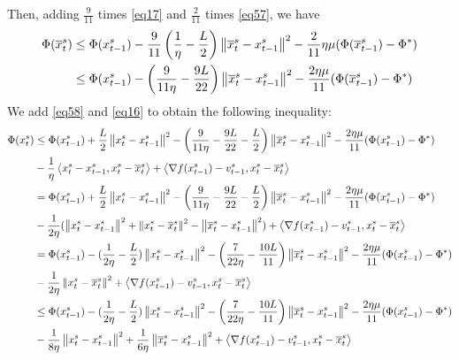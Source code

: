 \documentclass{article}
\newcommand{\norm}[1]{\left\lVert#1\right\rVert}
\newcommand{\Iprod}[2]{\left\langle #1,#2\right\rangle}
\theoremstyle{definition}
\theoremstyle{remark}
\begin{document}
Then, adding $\frac{9}{11}$ times \eqref{eq17} and $\frac{2}{11}$ times \eqref{eq57}, we have 
\begin{align}
\Phi(\overline{x}^s_t) &\leq \Phi({x}^s_{t-1}) -\frac{9}{11}\left(\frac{1}{\eta}-\frac{L}{2}\right) \norm{\overline{x}^s_t - {x}^s_{t-1}}^2-\frac{2}{11}\eta\mu(\Phi(\overline{x}^s_{t-1})-\Phi^*)\notag\\
&\leq \Phi({x}^s_{t-1}) -\left(\frac{9}{11\eta}-\frac{9L}{22}\right) \norm{\overline{x}^s_t - {x}^s_{t-1}}^2-\frac{2\eta\mu}{11}(\Phi(\overline{x}^s_{t-1})-\Phi^*)\label{eq58}
\end{align}
We add \eqref{eq58} and \eqref{eq16} to obtain the following inequality:
\begin{align}
\Phi({x}^s_t) &\leq \Phi({x}^s_{t-1}) +\frac{L}{2}\norm{{x}^s_{t}-{x}^s_{t-1}}^2-\left(\frac{9}{11\eta}-\frac{9L}{22}-\frac{L}{2}\right) \norm{\overline{x}^s_t - {x}^s_{t-1}}^2-\frac{2\eta\mu}{11}(\Phi({x}^s_{t-1})-\Phi^*)\notag\\
&-\frac{1}{\eta}\Iprod{{x}^s_t - {x}^s_{t-1}}{{x}^s_t - \overline{x}^s_{t}}+\Iprod{\nabla f({x}^s_{t-1}) - v_{t-1}^s}{{x}^s_t - \overline{x}^s_{t}}\notag\\
&= \Phi({x}^s_{t-1}) +\frac{L}{2}\norm{{x}^s_{t}-{x}^s_{t-1}}^2-\left(\frac{9}{11\eta}-\frac{9L}{22}-\frac{L}{2}\right) \norm{\overline{x}^s_t - {x}^s_{t-1}}^2-\frac{2\eta\mu}{11}(\Phi({x}^s_{t-1})-\Phi^*)\notag\\
&-\frac{1}{2\eta}(\norm{{x}^s_t - {x}^s_{t-1}}^2+\norm{{x}^s_t - \overline{x}^s_{t}}^2-\norm{\overline{x}^s_t - {x}^s_{t-1}}^2)+\Iprod{\nabla f({x}^s_{t-1}) - v_{t-1}^s}{{x}^s_t - \overline{x}^s_{t}}\notag\\
&= \Phi({x}^s_{t-1}) - (\frac{1}{2\eta} - \frac{L}{2})\norm{{x}^s_{t}-{x}^s_{t-1}}^2-\left(\frac{7}{22\eta}-\frac{10L}{11}\right) \norm{\overline{x}^s_t - {x}^s_{t-1}}^2-\frac{2\eta\mu}{11}(\Phi({x}^s_{t-1})-\Phi^*)\notag\\
&-\frac{1}{2\eta}\norm{{x}^s_t - \overline{x}^s_{t}}^2+\Iprod{\nabla f({x}^s_{t-1}) - v_{t-1}^s}{{x}^s_t - \overline{x}^s_{t}}\notag\\
&\leq \Phi({x}^s_{t-1}) - (\frac{1}{2\eta} - \frac{L}{2})\norm{{x}^s_{t}-{x}^s_{t-1}}^2-\left(\frac{7}{22\eta}-\frac{10L}{11}\right) \norm{\overline{x}^s_t - {x}^s_{t-1}}^2-\frac{2\eta\mu}{11}(\Phi({x}^s_{t-1})-\Phi^*)\notag\\
&-\frac{1}{8\eta}\norm{{x}^s_t - {x}^s_{t-1}}^2+\frac{1}{6\eta}\norm{\overline{x}^s_t - {x}^s_{t-1}}^2+\Iprod{\nabla f({x}^s_{t-1}) - v_{t-1}^s}{{x}^s_t - \overline{x}^s_{t}}\label{eq59}\\

\end{align}
\end{document}
